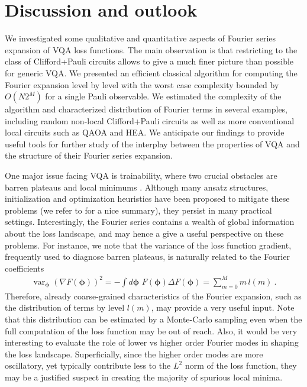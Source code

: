 \documentclass[twocolumn, amsfonts, amssymb, aps, nofootinbib]{revtex4-2}
\newcommand{\CP}{Clifford+Pauli}
\begin{document}
\section{Discussion and outlook}
We investigated some qualitative and quantitative aspects of Fourier series expansion of VQA loss functions. The main observation is that restricting to the class of \CP{} circuits allows to give a much finer picture than possible for generic VQA. We presented an efficient classical algorithm for computing the Fourier expansion level by level with the worst case complexity bounded by $O(N2^M)$ for a single Pauli observable. We estimated the complexity of the algorithm and characterized distribution of Fourier terms in several examples, including random non-local \CP{} circuits as well as more conventional local circuits such as QAOA and HEA. We anticipate our findings to provide useful tools for further study of the interplay between the properties of VQA and the structure of their Fourier series expansion.

One major issue facing VQA is trainability, where two crucial obstacles are barren plateaus \cite{McClean2018, Cerezo2021a} and local minimums \cite{Bittel2021, Anschuetz2022}. Although many ansatz structures, initialization and optimization heuristics have been proposed to mitigate these problems (we refer to \cite{Wang2023} for a nice summary), they persist in many practical settings. Interestingly, the Fourier series contains a wealth of global information about the loss landscape, and may hence a give a useful perspective on these problems. For instance, we note that the variance of the loss function gradient, frequently used to diagnose barren plateaus, is naturally related to the Fourier coefficients
\begin{align}
	\operatorname{var}_{\pmb\phi}\left(\nabla F(\pmb \phi)\right)^2=-\int d\pmb\phi\,\, F(\pmb\phi)\Delta F(\pmb\phi)=\sum_{m=0}^M m\, l(m) \ .
\end{align}
Therefore, already coarse-grained characteristics of the Fourier expansion, such as the distribution of terms by level $l(m)$, may provide a very useful input. Note that this distribution can be estimated by a Monte-Carlo sampling even when the full computation of the loss function may be out of reach. Also, it would be very interesting to evaluate the role of lower vs higher order Fourier modes in shaping the loss landscape. Superficially, since the higher order modes are more oscillatory, yet typically contribute less to the $L^2$ norm of the loss function, they may be a justified suspect in creating the majority of spurious local minima.
\end{document}
